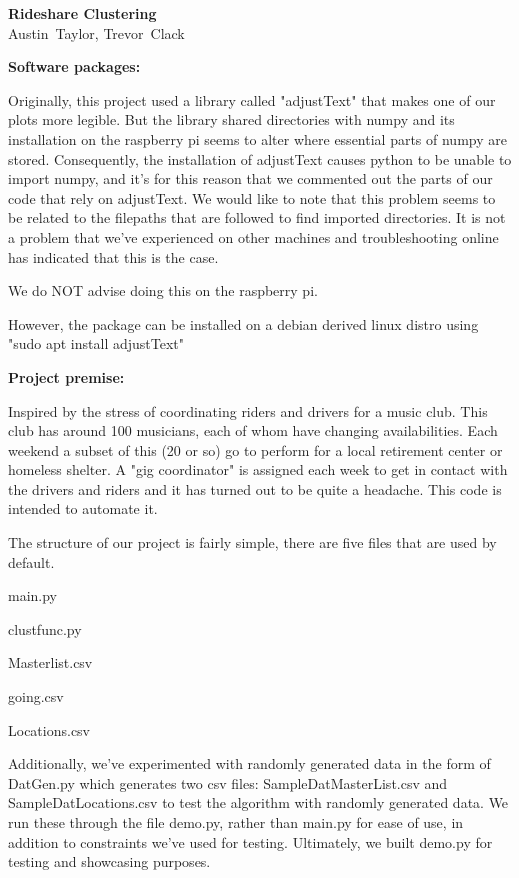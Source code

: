 \documentclass[11pt]{article}
\newcommand\thisis{Rideshare Clustering}
\newcommand\theauthor{Austin~Taylor, Trevor~Clack}
\begin{document}
\thispagestyle{firstpg}

\noindent
{\sffamily\bfseries\huge \thisis}\\

\noindent
{\large\sffamily \theauthor}

\vspace*{20bp}

\noindent
\textbf{Software packages:}

\hfill \break
Originally, this project used a library called "adjustText" that makes one of our plots more legible. But the library shared directories with numpy and its installation on the raspberry pi
seems to alter where essential parts of numpy are stored. Consequently, the installation of 
adjustText causes python to be unable to import numpy, and it's for this reason that we 
commented out the parts of our code that rely on adjustText. We would like to note that this 
problem seems to be related to the filepaths that are followed to find imported directories. 
It is not a problem that we've experienced on other machines and troubleshooting online has 
indicated that this is the case.

\hfill \break
\noindent
We do NOT advise doing this on the raspberry pi.

\hfill \break
\noindent
However, the package can be installed  on a debian derived linux distro using "sudo apt install adjustText"

\noindent
\hfill \break
\textbf{Project premise:}

\hfill \break
	Inspired by the stress of coordinating riders and drivers for a music club.
	This club has around 100 musicians, each of whom have changing 
	availabilities. Each weekend a subset of this (20 or so) go to perform for
	a local retirement center or homeless shelter. A "gig coordinator" is 
	assigned each week to get in contact with the drivers and riders and it
	has turned out to be quite a headache. This code is intended to automate it.

\hfill \break
\noindent
The structure of our project is fairly simple, there are five files that are used by default.
\hfill \break

main.py

clustfunc.py

Masterlist.csv

going.csv

Locations.csv

\hfill \break
Additionally, we've experimented with randomly generated data in the form of DatGen.py which
generates two csv files: SampleDatMasterList.csv and SampleDatLocations.csv to test the 
algorithm with randomly generated data. We run these through the file demo.py, rather than
main.py for ease of use, in addition to constraints we've used for testing. Ultimately, we 
built demo.py for testing and showcasing purposes.
\end{document}
